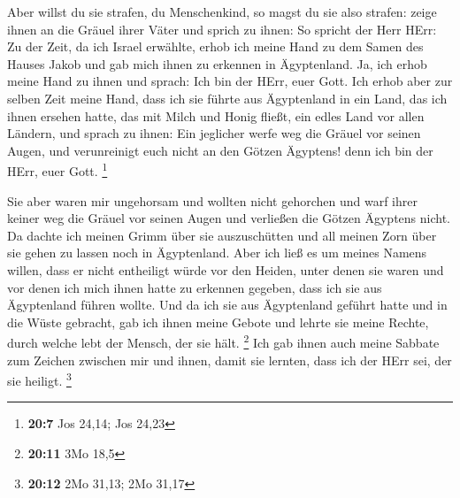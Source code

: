  Aber willst du sie strafen, du Menschenkind, so magst du
sie also strafen: zeige ihnen an die Gräuel ihrer Väter  und
sprich zu ihnen: So spricht der Herr HErr: Zu der Zeit, da ich Israel
erwählte, erhob ich meine Hand zu dem Samen des Hauses Jakob und gab
mich ihnen zu erkennen in Ägyptenland. Ja, ich erhob meine Hand zu ihnen
und sprach: Ich bin der HErr, euer Gott.  Ich erhob aber zur
selben Zeit meine Hand, dass ich sie führte aus Ägyptenland in ein Land,
das ich ihnen ersehen hatte, das mit Milch und Honig fließt, ein edles
Land vor allen Ländern,  und sprach zu ihnen: Ein jeglicher
werfe weg die Gräuel vor seinen Augen, und verunreinigt euch nicht an
den Götzen Ägyptens! denn ich bin der HErr, euer Gott. \footnote{\textbf{20:7}
  Jos 24,14; Jos 24,23}

 Sie aber waren mir ungehorsam und wollten nicht gehorchen
und warf ihrer keiner weg die Gräuel vor seinen Augen und verließen die
Götzen Ägyptens nicht. Da dachte ich meinen Grimm über sie auszuschütten
und all meinen Zorn über sie gehen zu lassen noch in Ägyptenland.
 Aber ich ließ es um meines Namens willen, dass er nicht
entheiligt würde vor den Heiden, unter denen sie waren und vor denen ich
mich ihnen hatte zu erkennen gegeben, dass ich sie aus Ägyptenland
führen wollte.  Und da ich sie aus Ägyptenland geführt
hatte und in die Wüste gebracht,  gab ich ihnen meine
Gebote und lehrte sie meine Rechte, durch welche lebt der Mensch, der
sie hält. \footnote{\textbf{20:11} 3Mo 18,5}  Ich gab ihnen
auch meine Sabbate zum Zeichen zwischen mir und ihnen, damit sie
lernten, dass ich der HErr sei, der sie heiligt. \footnote{\textbf{20:12}
  2Mo 31,13; 2Mo 31,17}

